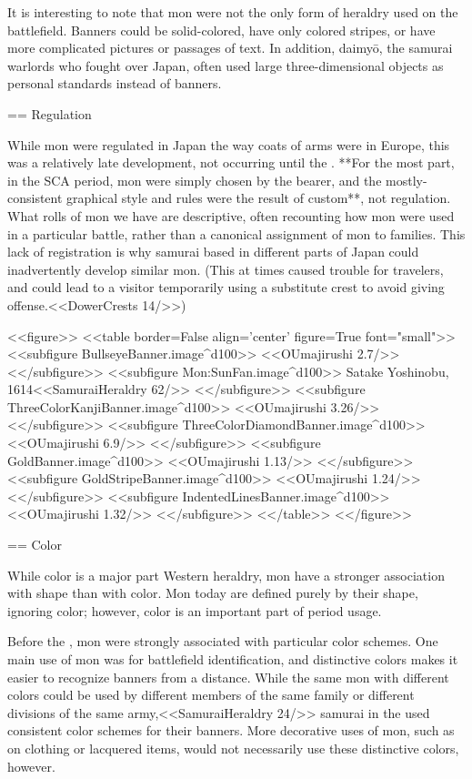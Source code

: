   It is interesting to note that mon were not the only form of
  heraldry used on the battlefield.  Banners could be solid-colored,
  have only colored stripes, or have more complicated pictures or
  passages of text.  In addition, daimyō, the samurai warlords who
  fought over \SengokuPeriod Japan, often used large three-dimensional
  objects as personal standards instead of banners.

  == Regulation

  While mon were regulated in Japan the way coats of arms were in
  Europe, this was a relatively late development, not occurring until
  the \EdoPeriod.  **For the most part, in the SCA period, mon were
  simply chosen by the bearer, and the mostly-consistent graphical
  style and rules were the result of custom**, not regulation.  What
  rolls of mon we have are descriptive, often recounting how mon were
  used in a particular battle, rather than a canonical assignment of
  mon to families.  This lack of registration is why samurai based in different
  parts of Japan could inadvertently develop similar mon.  (This at times
  caused trouble for travelers, and could lead to a visitor
  temporarily using a substitute crest to avoid giving
  offense.<<DowerCrests 14/>>)

  <<figure>>
  <<table border=False align='center' figure=True font="small">>
  <<subfigure BullseyeBanner.image^d100>>
    \label{2c}<<OUmajirushi 2.7/>>
  <</subfigure>>
  <<subfigure Mon:SunFan.image^d100>>
    \label{3c1}Satake Yoshinobu, 1614<<SamuraiHeraldry 62/>>
  <</subfigure>>
  <<subfigure ThreeColorKanjiBanner.image^d100>>
    \label{3c2}<<OUmajirushi 3.26/>>
  <</subfigure>>
  <<subfigure ThreeColorDiamondBanner.image^d100>>
    \label{3c3}<<OUmajirushi 6.9/>>
  <</subfigure>>
  <<subfigure GoldBanner.image^d100>>
    \label{solid}<<OUmajirushi 1.13/>>
  <</subfigure>>
  <<subfigure GoldStripeBanner.image^d100>>
    \label{basic1}<<OUmajirushi 1.24/>>
  <</subfigure>>
  <<subfigure IndentedLinesBanner.image^d100>>
    \label{basic2}<<OUmajirushi 1.32/>>
  <</subfigure>>
  <</table>>
  <</figure>>

  == Color

  While color is a major part Western heraldry, mon have a
  stronger association with shape than with color.  Mon today are
  defined purely by their shape, ignoring color; however, color is an
  important part of period usage.

  Before the \EdoPeriod, mon were strongly associated with particular
  color schemes.  One main use of mon was for battlefield
  identification, and distinctive colors makes it easier to recognize
  banners from a distance.  While the same mon with different colors
  could be used by different members of the same family or different
  divisions of the same army,<<SamuraiHeraldry 24/>> samurai in the
  \SengokuPeriod used consistent color schemes for their banners.
  More decorative uses of mon, such as on clothing or lacquered items,
  would not necessarily use these distinctive colors, however.

